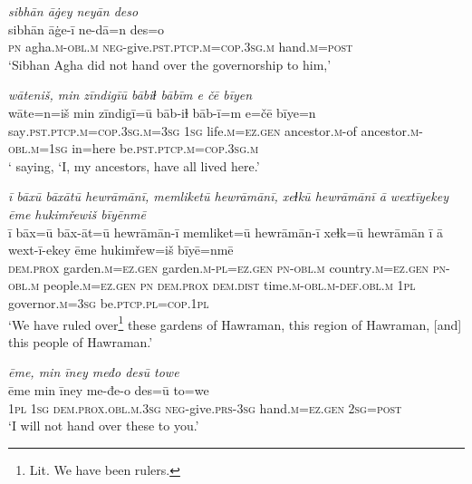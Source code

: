 \ea \label{DP.19}
\textit{sibhān āġey neyān deso} \\ 
\gll sibhān āġe-ī ne-dā=n des=o \\ 
 \textsc{pn} agha\textsc{.m}\textsc{-obl}\textsc{.m} \textsc{neg-}give\textsc{.pst}\textsc{.ptcp}\textsc{.m}\textsc{=cop}\textsc{.3sg}\textsc{.m} hand\textsc{.m}\textsc{=\textsc{post}} \\ 
\glt `Sibhan Agha did not hand over the governorship to him,'
\z 
 
\ea \label{DP.20}
\textit{wāteniš, min zīndigīū bābiɫ bābīm e čē bīyen} \\ 
\gll wāte=n=iš min zīndigī=ū bāb-iɫ bāb-ī=m e=čē bīye=n \\ 
 say\textsc{.pst}\textsc{.ptcp}\textsc{.m}\textsc{=cop}\textsc{.3sg}\textsc{.m}\textsc{=3sg} \textsc{1sg} life\textsc{.m}\textsc{=ez}\textsc{.gen} ancestor\textsc{.m}-of ancestor\textsc{.m}\textsc{-obl}\textsc{.m}\textsc{=1sg} in=here be\textsc{.pst}\textsc{.ptcp}\textsc{.m}\textsc{=cop}\textsc{.3sg}\textsc{.m} \\ 
\glt ` saying, ‘I, my ancestors, have all lived here.'
\z 
 
\ea \label{DP.21}
\textit{ī bāxū bāxātū hewrāmānī, memliketū hewrāmānī, xeɫkū hewrāmānī ā wextīyekey ēme hukimřewiš bīyēnmē} \\ 
\gll ī bāx=ū bāx-āt=ū hewrāmān-ī memliket=ū hewrāmān-ī xeɫk=ū hewrāmān ī ā wext-ī-ekey ēme hukimřew=iš bīyē=nmē \\ 
 \textsc{dem.prox} garden\textsc{.m}\textsc{=ez}\textsc{.gen} garden\textsc{.m}\textsc{-pl}\textsc{=ez}\textsc{.gen} \textsc{pn}\textsc{-obl}\textsc{.m} country\textsc{.m}\textsc{=ez}\textsc{.gen} \textsc{pn}\textsc{-obl}\textsc{.m} people\textsc{.m}\textsc{=ez}\textsc{.gen} \textsc{pn} \textsc{dem.prox} \textsc{dem.dist} time\textsc{.m}\textsc{-obl}\textsc{.m}\textsc{-def}\textsc{.obl}\textsc{.m} \textsc{1pl} governor\textsc{.m}\textsc{=3sg} be\textsc{.ptcp}\textsc{.pl}\textsc{=cop}\textsc{.1pl} \\ 
\glt `We have ruled over\footnote{Lit. We have been rulers.} these gardens of Hawraman, this region of Hawraman, [and] this people of Hawraman.'
\z 
 
\ea \label{DP.22}
\textit{ēme, min īney međo desū towe} \\ 
\gll ēme min īney me-đe-o des=ū to=we \\ 
 \textsc{1pl} \textsc{1sg} \textsc{dem.prox}\textsc{.obl}\textsc{.m}\textsc{.3sg} \textsc{neg-}give\textsc{.prs}\textsc{-3sg} hand\textsc{.m}\textsc{=ez}\textsc{.gen} \textsc{2sg}\textsc{=\textsc{post}} \\ 
\glt `I will not hand over these to you.'
\z 
 
